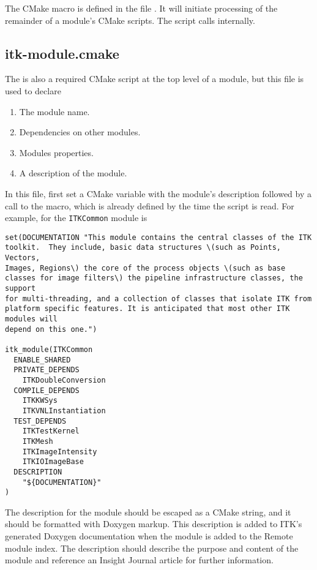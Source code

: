 The CMake macro  is defined in the file
. It will initiate processing of the
remainder of a module's CMake scripts. The script 
calls  internally.


\subsection{itk-module.cmake}

The  is also a required CMake script at the top level
of a module, but this file is used to declare

\begin{enumerate}
  \item The module name.
  \item Dependencies on other modules.
  \item Modules properties.
  \item A description of the module.
\end{enumerate}

In this file, first set a CMake variable with the module's
description followed by a call to the  macro, which is
already defined by the time the script is read. For example,
 for the \texttt{ITKCommon} module is

\begin{verbatim}
set(DOCUMENTATION "This module contains the central classes of the ITK
toolkit.  They include, basic data structures \(such as Points, Vectors,
Images, Regions\) the core of the process objects \(such as base
classes for image filters\) the pipeline infrastructure classes, the support
for multi-threading, and a collection of classes that isolate ITK from
platform specific features. It is anticipated that most other ITK modules will
depend on this one.")

itk_module(ITKCommon
  ENABLE_SHARED
  PRIVATE_DEPENDS
    ITKDoubleConversion
  COMPILE_DEPENDS
    ITKKWSys
    ITKVNLInstantiation
  TEST_DEPENDS
    ITKTestKernel
    ITKMesh
    ITKImageIntensity
    ITKIOImageBase
  DESCRIPTION
    "${DOCUMENTATION}"
)
\end{verbatim}

The description for the module should be escaped as a CMake string, and it
should be formatted with Doxygen markup. This description is added to ITK's
generated Doxygen documentation when the module is added to the Remote module
index. The description should describe the purpose and content of the module
and reference an Insight Journal article for further information.

